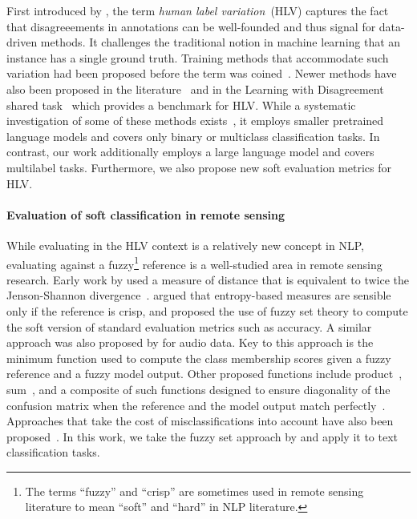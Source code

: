 \documentclass[shortpaper]{clv2025}
\begin{document}
First introduced by \citet{plank2022}, the term \textit{human label
  variation}~(HLV) captures the fact that disagreeements in annotations can be
well-founded and thus signal for data-driven methods. It challenges the
traditional notion in machine learning that an instance has a single ground
truth. Training methods that accommodate such variation had been proposed before
the term was coined~\citep[\textit{inter alia}]{sheng2008,peterson2019,uma2020}.
Newer methods have also been proposed in the
literature~\citep{deng2023,lee2023,chen2024,rodriguez-barroso2024} and in the
Learning with Disagreement shared task~\citep{leonardelli2023} which provides a
benchmark for HLV. While a systematic investigation of some of these methods
exists~\citep{uma2020}, it employs smaller pretrained language models and covers
only binary or multiclass classification tasks. In contrast, our work
additionally employs a large language model and covers multilabel tasks.
Furthermore, we also propose new soft evaluation metrics for HLV.

\paragraph{Evaluation of soft classification in remote sensing}

While evaluating in the HLV context is a relatively new concept in NLP,
evaluating against a fuzzy\footnote{The terms ``fuzzy'' and ``crisp'' are sometimes
  used in remote sensing literature to mean ``soft'' and ``hard'' in NLP
  literature.} reference is a well-studied area in remote sensing research.
Early work by \citet{foody1996} used a measure of distance that is equivalent to
twice the Jenson-Shannon divergence~\citep{lin1991}. \citet{binaghi1999} argued
that entropy-based measures are sensible only if the reference is crisp, and
proposed the use of fuzzy set theory to compute the soft version of standard
evaluation metrics such as accuracy. A similar approach was also proposed by
\citet{harju2023} for audio data. Key to this approach is the minimum function
used to compute the class membership scores given a fuzzy reference and a fuzzy
model output. Other proposed functions include product~\citep{lewis2001},
sum~\citep{pontius2006a}, and a composite of such functions designed to ensure
diagonality of the confusion matrix when the reference and the model output
match perfectly~\citep{pontius2006,silvan-cardenas2008}. Approaches that take
the cost of misclassifications into account have also been
proposed~\citep{gomez2008}. In this work, we take the fuzzy set approach by
\citet{binaghi1999} and apply it to text classification tasks.
\end{document}

